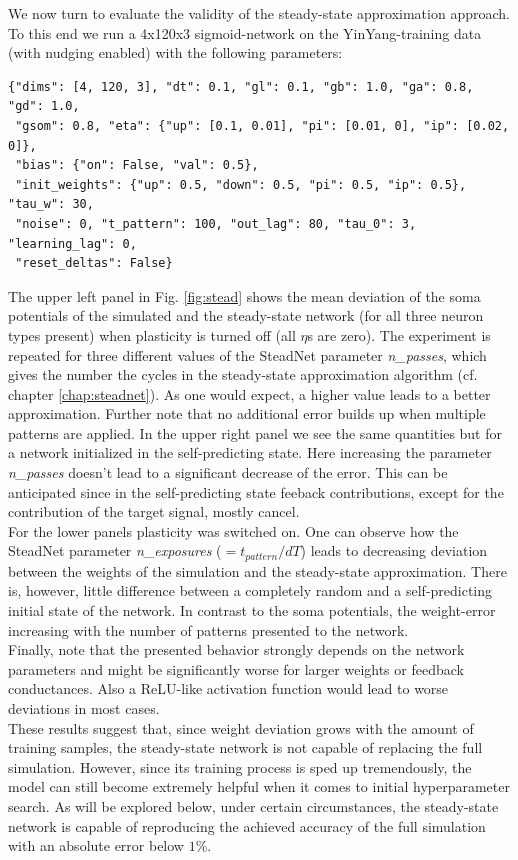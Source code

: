 \documentclass[12pt,a4paper]{article}
\begin{document}
We now turn to evaluate the validity of the steady-state approximation approach. To this end we run a 4x120x3 sigmoid-network on the YinYang-training data \cite{code} (with nudging enabled) with the following parameters:
\begin{verbatim}
{"dims": [4, 120, 3], "dt": 0.1, "gl": 0.1, "gb": 1.0, "ga": 0.8, "gd": 1.0,
 "gsom": 0.8, "eta": {"up": [0.1, 0.01], "pi": [0.01, 0], "ip": [0.02, 0]},
 "bias": {"on": False, "val": 0.5},
 "init_weights": {"up": 0.5, "down": 0.5, "pi": 0.5, "ip": 0.5}, "tau_w": 30,
 "noise": 0, "t_pattern": 100, "out_lag": 80, "tau_0": 3, "learning_lag": 0,
 "reset_deltas": False}
\end{verbatim}
The upper left panel in Fig. \ref{fig:stead} shows the mean deviation of the soma potentials of the simulated and the steady-state network (for all three neuron types present) when plasticity is turned off (all $\eta$s are zero). The experiment is repeated for three different values of the SteadNet parameter \textit{n\_passes}, which gives the number the cycles in the steady-state approximation algorithm (cf. chapter \ref{chap:steadnet}). As one would expect, a higher value leads to a better approximation. Further note that no additional error builds up when multiple patterns are applied. In the upper right panel we see the same quantities but for a network initialized in the self-predicting state. Here increasing the parameter \textit{n\_passes} doesn't lead to a significant decrease of the error. This can be anticipated since in the self-predicting state feeback contributions, except for the contribution of the target signal, mostly cancel.\\
For the lower panels plasticity was switched on. One can observe how the SteadNet parameter \textit{n\_exposures} ($=t_{pattern}/dT$) leads to decreasing deviation between the weights of the simulation and the steady-state approximation. There is, however, little difference between a completely random and a self-predicting initial state of the network. In contrast to the soma potentials, the weight-error increasing with the number of patterns presented to the network.\\
Finally, note that the presented behavior strongly depends on the network parameters and might be significantly worse for larger weights or feedback conductances. Also a ReLU-like activation function would lead to worse deviations in most cases.\\
These results suggest that, since weight deviation grows with the amount of training samples, the steady-state network is not capable of replacing the full simulation. However, since its training process is sped up tremendously, the model can still become extremely helpful when it comes to initial hyperparameter search. As will be explored below, under certain circumstances, the steady-state network is capable of reproducing the achieved accuracy of the full simulation with an absolute error below $1 \%$.
\end{document}
